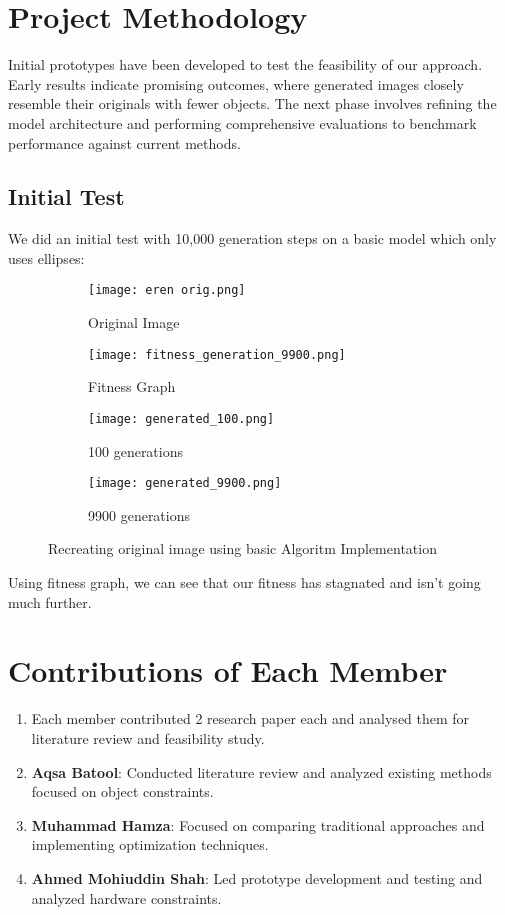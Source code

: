 \documentclass[10pt, conference]{IEEEtran}
\begin{document}
\section{Project Methodology}
Initial prototypes have been developed to test the feasibility of our approach. Early results indicate promising outcomes, where generated images closely resemble their originals with fewer objects. The next phase involves refining the model architecture and performing comprehensive evaluations to benchmark performance against current methods.

\subsection*{
	Initial Test
}
We did an initial test with 10,000 generation steps on a basic model which only uses ellipses:\\
\begin{figure}[h]
	\centering
	\begin{subfigure}{0.4\linewidth}
		\centering
		\texttt{[image: eren orig.png]}
		\caption{Original Image}
	\end{subfigure}%
	\hfill
	\begin{subfigure}{0.4\linewidth}
		\centering
		\texttt{[image: fitness\_generation\_9900.png]}
		\caption{Fitness Graph}
	\end{subfigure}
	\begin{subfigure}{0.4\linewidth}
		\centering
		\texttt{[image: generated\_100.png]}
		\caption{100 generations}
	\end{subfigure}
	\begin{subfigure}{0.4\linewidth}
		\centering
		\texttt{[image: generated\_9900.png]}
		\caption{9900 generations}
	\end{subfigure}
	\caption{Recreating original image using basic Algoritm Implementation}
\end{figure}

Using fitness graph, we can see that our fitness has stagnated and isn't going much further.

\section{Contributions of Each Member}

\begin{enumerate}[label=\arabic*)]
	\item  Each member contributed 2 research paper each and analysed them for literature review and feasibility study.
	\item \textbf{Aqsa Batool}: Conducted literature review and analyzed existing methods focused on object constraints.
	\item \textbf{Muhammad Hamza}: Focused on comparing traditional approaches and implementing optimization techniques.
	\item \textbf{Ahmed Mohiuddin Shah}: Led prototype development and testing and analyzed hardware constraints.
\end{enumerate}
\end{document}
